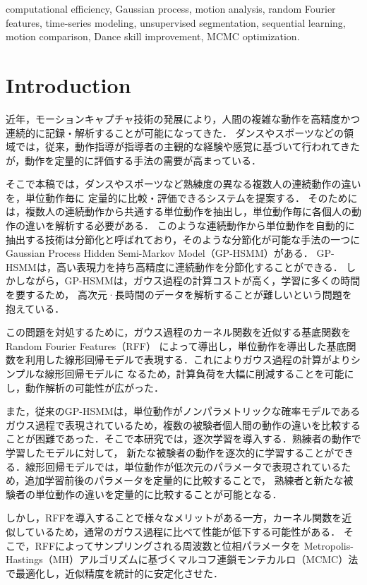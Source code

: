 \documentclass[conference]{IEEEtran}
\begin{document}
\begin{IEEEkeywords}
computational efficiency, Gaussian process, motion analysis, random Fourier features, time-series modeling, unsupervised segmentation, sequential learning, motion comparison, Dance skill improvement, MCMC optimization.
\end{IEEEkeywords}

\section{Introduction}
近年，モーションキャプチャ技術の発展により，人間の複雑な動作を高精度かつ連続的に記録・解析することが可能になってきた\cite{Balazia2018, 3DPW2018, Thoker2021, Lam2023, Suo2024, DanceMVP2024}．
ダンスやスポーツなどの領域では，従来，動作指導が指導者の主観的な経験や感覚に基づいて行われてきたが，動作を定量的に評価する手法の需要が高まっている．

そこで本稿では，ダンスやスポーツなど熟練度の異なる複数人の連続動作の違いを，単位動作毎に
定量的に比較・評価できるシステムを提案する．
そのためには，複数人の連続動作から共通する単位動作を抽出し，単位動作毎に各個人の動作の違いを解析する必要がある．
このような連続動作から単位動作を自動的に抽出する技術は分節化と呼ばれており，そのような分節化が可能な手法の一つに
Gaussian Process Hidden Semi-Markov Model（GP-HSMM）\cite{Nakamura2017}がある．
GP-HSMMは，高い表現力を持ち高精度に連続動作を分節化することができる．
しかしながら，GP-HSMMは，ガウス過程の計算コストが高く，学習に多くの時間を要するため，
高次元·長時間のデータを解析することが難しいという問題を抱えている．

この問題を対処するために，ガウス過程のカーネル関数を近似する基底関数をRandom Fourier Features（RFF）\cite{Rahimi2007} 
によって導出し，単位動作を導出した基底関数を利用した線形回帰モデルで表現する．これによりガウス過程の計算がよりシンプルな線形回帰モデルに
なるため，計算負荷を大幅に削減することを可能にし，動作解析の可能性が広がった．

また，従来のGP-HSMMは，単位動作がノンパラメトリックな確率モデルであるガウス過程で表現されているため，複数の被験者個人間の動作の違いを比較することが困難であった．そこで本研究では，逐次学習\cite{Broderick2013}を導入する．熟練者の動作で学習したモデルに対して，
新たな被験者の動作を逐次的に学習することができる．線形回帰モデルでは，単位動作が低次元のパラメータで表現されているため，追加学習前後のパラメータを定量的に比較することで，
熟練者と新たな被験者の単位動作の違いを定量的に比較することが可能となる．

しかし，RFFを導入することで様々なメリットがある一方，カーネル関数を近似しているため，通常のガウス過程に比べて性能が低下する可能性がある．
そこで，RFFによってサンプリングされる周波数と位相パラメータを Metropolis-Hastings（MH）アルゴリズムに基づくマルコフ連鎖モンテカルロ（MCMC）法\cite{Hastings1970} で最適化し，近似精度を統計的に安定化させた．
\end{document}
